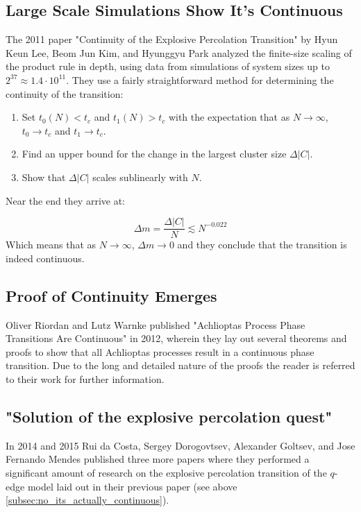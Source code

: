 \subsection{Large Scale Simulations Show It's Continuous}
The 2011 paper "Continuity of the Explosive Percolation Transition" \cite{Lee_1} by Hyun Keun Lee, Beom Jun Kim, and Hyunggyu Park analyzed the finite-size scaling of the product rule in depth, using data from simulations of system sizes up to $2^{37} \approx 1.4 \cdot 10^{11}$.
They use a fairly straightforward method for determining the continuity of the transition:

\begin{enumerate}
	\item Set $t_0(N) < t_c$ and $t_1(N) > t_c$ with the expectation that as $N \rightarrow \infty$, $t_0 \rightarrow t_c$ and $t_1 \rightarrow t_c$.
	\item Find an upper bound for the change in the largest cluster size $\Delta |C|$.
	\item Show that $\Delta |C|$ scales sublinearly with $N$.
\end{enumerate}

Near the end they arrive at:

\begin{equation}
	\Delta m = \frac{\Delta |C|}{N} \lesssim N^{-0.022}
\end{equation}
Which means that as $N \rightarrow \infty$, $\Delta m \rightarrow 0$ and they conclude that the transition is indeed continuous.



\subsection{Proof of Continuity Emerges}
Oliver Riordan and Lutz Warnke published "Achlioptas Process Phase Transitions Are
Continuous" \cite{Riordan_1} in 2012, wherein they lay out several theorems and proofs to show that all Achlioptas processes result in a continuous phase transition.
Due to the long and detailed nature of the proofs the reader is referred to their work for further information.



\subsection{"Solution of the explosive percolation quest"}
In 2014 and 2015 Rui da Costa, Sergey Dorogovtsev, Alexander Goltsev, and Jose Fernando Mendes published three more papers \cite{da_Costa_5, da_Costa_2, da_Costa_3} where they performed a significant amount of research on the explosive percolation transition of the $q$-edge model laid out in their previous paper (see above \ref{subsec:no_its_actually_continuous}).

